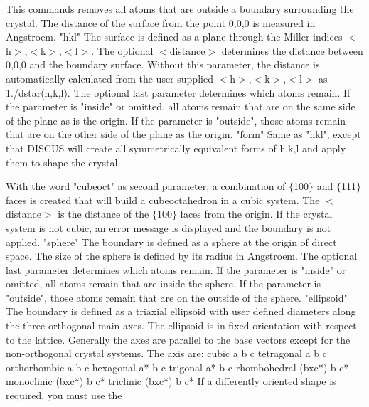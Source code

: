 \par
This commands removes all atoms that are outside a boundary surrounding 
the crystal. The distance of the surface from the point 0,0,0 is measured 
in Angstroem. 
"hkl"  The surface is defined as a plane through the Miller indices 
       $ <$h$> $,$ <$k$> $,$ <$l$> $. The optional $ <$distance$> $ determines the distance 
       between 0,0,0 and the boundary surface. Without this parameter, 
       the distance is automatically calculated from the user supplied 
       $ <$h$> $,$ <$k$> $,$ <$l$> $ as 1./dstar(h,k,l). 
       The optional last parameter determines which atoms remain. 
       If the parameter is "inside" or omitted, all atoms remain that 
       are on the same side of the plane as is the origin. 
       If the parameter is "outside", those atoms remain that are on 
       the other side of the plane as the origin. 
"form" Same as "hkl", except that DISCUS will create all symmetrically 
       equivalent forms of h,k,l and apply them to shape the crystal 
\par
       With the word "cubeoct" as second parameter, a combination of 
       $ \{$100$\} $ and $ \{$111$\} $ faces is created that will build a cubeoctahedron 
       in a cubic system. The $ <$distance$> $ is the distance of the $ \{$100$\} $ 
       faces from the origin. 
       If the crystal system is not cubic, an error message is 
       displayed and the boundary is not applied. 
"sphere" The boundary is defined as a sphere at the origin of direct 
       space. The size of the sphere is defined by its radius in Angstroem. 
       The optional last parameter determines which atoms remain. 
       If the parameter is "inside" or omitted, all atoms remain that 
       are inside the sphere. 
       If the parameter is "outside", those atoms remain that are on 
       the outside of the sphere. 
"ellipsoid" The boundary is defined as a triaxial ellipsoid with user 
       defined diameters along the three orthogonal main axes. 
       The ellipsoid is in fixed orientation with respect to the lattice. 
       Generally the axes are parallel to the base vectors except for the 
       non-orthogonal crystal systems. The axis are: 
       cubic           a       b      c 
       tetragonal      a       b      c 
       orthorhombic    a       b      c 
       hexagonal       a*      b      c 
       trigonal        a*      b      c 
       rhombohedral   (bxc*)   b      c* 
       monoclinic     (bxc*)   b      c* 
       triclinic      (bxc*)   b      c* 
       If a differently oriented shape is required, you must use the 
